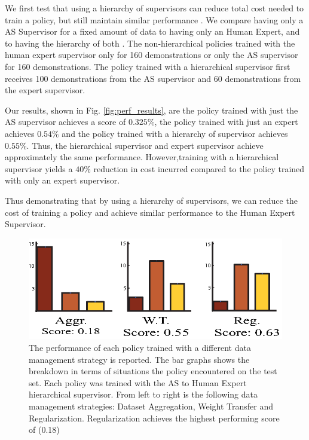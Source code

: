 \documentclass[10pt, conference]{ieeeconf}      %
\begin{document}
We first test that using a hierarchy of supervisors can reduce total cost needed to train a policy, but still maintain
similar performance . We compare having only a AS Supervisor for a fixed amount of data to having only an Human Expert,
and to having the hierarchy of both . The non-hierarchical policies trained with the human expert supervisor only for
160 demonstrations or only the AS supervisor for 160 demonstrations.  The policy trained with a hierarchical supervisor
first receives  100 demonstrations from the AS supervisor and  60 demonstrations from the expert supervisor. 

Our results, shown in Fig. \ref{fig:perf_results}, are the policy trained with just the AS supervisor achieves a score of $0.325\%$, the policy trained with just an expert achieves $0.54\%$ and the policy trained with a hierarchy of supervisor achieves $0.55\%$.  Thus, the hierarchical supervisor and expert supervisor achieve approximately the same performance. However,training with a hierarchical supervisor yields a $40\%$ reduction in cost incurred compared to the policy trained with only an expert supervisor. 

Thus demonstrating that by using a hierarchy of supervisors, we can reduce the cost of training a policy and achieve similar performance to the Human Expert Supervisor.

\begin{figure}[t]
\centering 
\includegraphics{f_figs/cost_result.eps}

\caption{\footnotesize The performance of each policy trained with a different data management strategy is reported. The
bar graphs shows the breakdown in terms of situations the policy encountered on the test set. Each policy was trained
with the AS to Human Expert hierarchical supervisor. From left to right is the following data management strategies: Dataset Aggregation, Weight Transfer and Regularization. Regularization achieves the highest performing score of (0.18) }
\label{fig:cost_result}
\end{figure}
\end{document}
